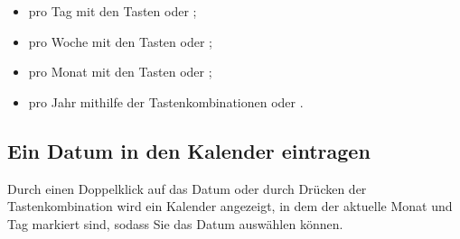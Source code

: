 \begin{itemize}
	\item pro Tag mit den Tasten \keys{{+}} oder \keys{{-}};
	\item pro Woche mit den Tasten \keys{\shift+{+}} oder \keys{\shift+{-}};
	\item pro Monat mit den Tasten  oder ;
	\item pro Jahr mithilfe der Tastenkombinationen  oder .
\end{itemize}


\subsection{Ein Datum in den Kalender eintragen\label{transactions-new-calendar}}

Durch einen Doppelklick auf das Datum oder durch Drücken der Tastenkombination  wird ein Kalender angezeigt, in dem der aktuelle Monat und Tag markiert sind, sodass Sie das Datum auswählen können.

